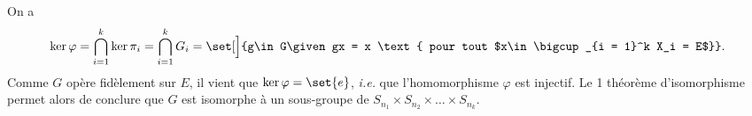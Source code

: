 On a
\[
  \ker \varphi = \bigcap_{i = 1}^k \ker \pi_i 
               = \bigcap_{i = 1}^k G_i = \set[\Big]{g\in G\given gx 
               = x \text{ pour tout $x\in\bigcup_{i = 1}^k X_i = E$}}.
\]
Comme $G$ opère fidèlement sur $E$, il vient que $\ker \varphi = \set{e}$, \emph{i.e.} que l'homomorphisme $\varphi$ est injectif.
Le 1\ier{} théorème d'isomorphisme permet alors de conclure que $G$ est isomorphe à un sous-groupe de $S_{n_1}\times S_{n_2}\times\dots\times S_{n_k}$.
